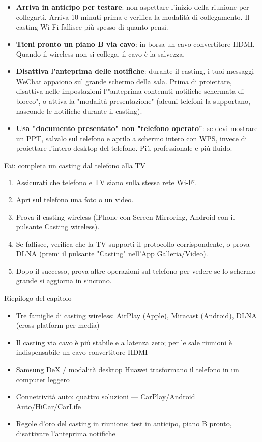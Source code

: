 \begin{itemize}
  \item \textbf{Arriva in anticipo per testare}: non aspettare l'inizio della riunione per collegarti. Arriva 10 minuti prima e verifica la modalità di collegamento. Il casting Wi-Fi fallisce più spesso di quanto pensi.
  \item \textbf{Tieni pronto un piano B via cavo}: in borsa un cavo convertitore HDMI. Quando il wireless non si collega, il cavo è la salvezza.
  \item \textbf{Disattiva l'anteprima delle notifiche}: durante il casting, i tuoi messaggi WeChat appaiono sul grande schermo della sala. Prima di proiettare, disattiva nelle impostazioni l'"anteprima contenuti notifiche schermata di blocco", o attiva la "modalità presentazione" (alcuni telefoni la supportano, nasconde le notifiche durante il casting).
  \item \textbf{Usa "documento presentato" non "telefono operato"}: se devi mostrare un PPT, salvalo sul telefono e aprilo a schermo intero con WPS, invece di proiettare l'intero desktop del telefono. Più professionale e più fluido.
\end{itemize}

\begin{tcbpractice}{Fai: completa un casting dal telefono alla TV}
\begin{enumerate}
  \item Assicurati che telefono e TV siano sulla stessa rete Wi-Fi.
  \item Apri sul telefono una foto o un video.
  \item Prova il casting wireless (iPhone con Screen Mirroring, Android con il pulsante Casting wireless).
  \item Se fallisce, verifica che la TV supporti il protocollo corrispondente, o prova DLNA (premi il pulsante "Casting" nell'App Galleria/Video).
  \item Dopo il successo, prova altre operazioni sul telefono per vedere se lo schermo grande si aggiorna in sincrono.
\end{enumerate}

\end{tcbpractice}

\begin{tcbsummary}{Riepilogo del capitolo}
\begin{itemize}
  \item Tre famiglie di casting wireless: AirPlay (Apple), Miracast (Android), DLNA (cross-platform per media)
  \item Il casting via cavo è più stabile e a latenza zero; per le sale riunioni è indispensabile un cavo convertitore HDMI
  \item Samsung DeX / modalità desktop Huawei trasformano il telefono in un computer leggero
  \item Connettività auto: quattro soluzioni — CarPlay/Android Auto/HiCar/CarLife
  \item Regole d'oro del casting in riunione: test in anticipo, piano B pronto, disattivare l'anteprima notifiche
\end{itemize}

\end{tcbsummary}

